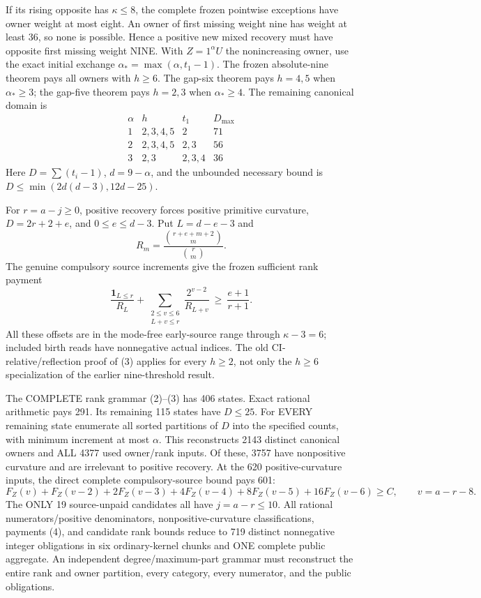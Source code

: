 If its rising opposite has $\kappa\le8$, the complete frozen pointwise
exceptions have owner weight at most eight. An owner of first missing
weight nine has weight at least 36, so none is possible. Hence a positive
new mixed recovery must have opposite first missing weight NINE.
With $Z=1^\alpha U$ the nonincreasing owner, use the exact initial
exchange $\alpha_* =\max(\alpha,t_1-1)$.
The frozen absolute-nine theorem pays all owners with $h\ge6$.
The gap-six theorem pays $h=4,5$ when $\alpha_*\ge3$; the gap-five
theorem pays $h=2,3$ when $\alpha_*\ge4$.
The remaining canonical domain is
\[
\begin{array}{c|c|c|c}
 \alpha& h& t_1& D_{\max}\\\hline
 1&2,3,4,5&2&71\\
 2&2,3,4,5&2,3&56\\
 3&2,3&2,3,4&36
\end{array}                                                     \tag{2}
\]
Here $D=\sum(t_i-1)$, $d=9-\alpha$, and the unbounded necessary
bound is $D\le\min(2d(d-3),12d-25)$.

For $r=a-j\ge0$, positive recovery forces positive primitive curvature,
$D=2r+2+e$, and $0\le e\le d-3$. Put $L=d-e-3$ and
\[
 R_m=\frac{\binom{r+e+m+2}{m}}{\binom r m}.
\]
The genuine compulsory source increments give the frozen sufficient
rank payment
\[
 \frac{\mathbf1_{L\le r}}{R_L}
 +\sum_{\substack{2\le v\le6\\L+v\le r}}
       \frac{2^{v-2}}{R_{L+v}}\ \ge\ \frac{e+1}{r+1}.    \tag{3}
\]
All these offsets are in the mode-free early-source range through
$\kappa-3=6$; included birth reads have nonnegative actual indices.
The old CI-relative/reflection proof of (3) applies for every $h\ge2$,
not only the $h\ge6$ specialization of the earlier nine-threshold result.

The COMPLETE rank grammar (2)--(3) has 406 states. Exact rational
arithmetic pays 291. Its remaining 115 states have $D\le25$.
For EVERY remaining state enumerate all sorted partitions of $D$ into
the specified counts, with minimum increment at most $\alpha$.
This reconstructs 2143 distinct canonical owners and ALL 4377 used
owner/rank inputs. Of these, 3757 have nonpositive curvature and are
irrelevant to positive recovery. At the 620 positive-curvature inputs,
the direct complete compulsory-source bound pays 601:
\[
 F_Z(v)+F_Z(v-2)+2F_Z(v-3)+4F_Z(v-4)
                  +8F_Z(v-5)+16F_Z(v-6)\ge C,
 \qquad v=a-r-8.                                      \tag{4}
\]
The ONLY 19 source-unpaid candidates all have $j=a-r\le10$.
All rational numerators/positive denominators, nonpositive-curvature
classifications, payments (4), and candidate rank bounds reduce to
719 distinct nonnegative integer obligations in six ordinary-kernel
chunks and ONE complete public aggregate. An independent degree/maximum-part
grammar must reconstruct the entire rank and owner partition, every
category, every numerator, and the public obligations.

